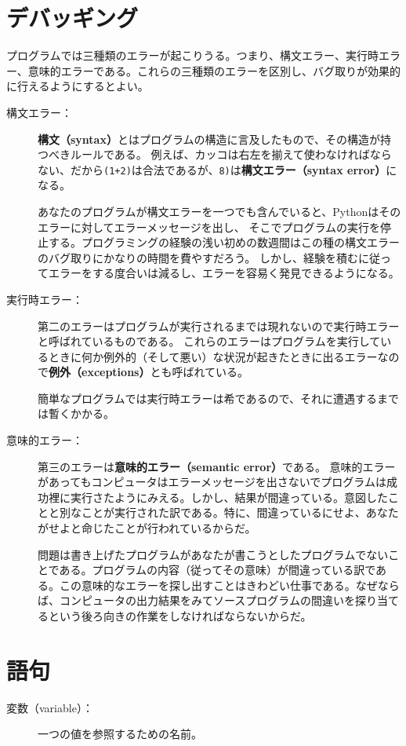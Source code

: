 \documentclass[a4j,12pt,makeidx]{jbook}
\begin{document}
{\section{デバッギング}
プログラムでは三種類のエラーが起こりうる。つまり、構文エラー、実行時エラー、意味的エラーである。これらの三種類のエラーを区別し、バグ取りが効果的に行えるようにするとよい。
\begin{description}
\item[構文エラー：] {\bf 構文（syntax）}とはプログラムの構造に言及したもので、その構造が持つべきルールである。
例えば、カッコは右左を揃えて使わなければならない、だから{\tt (1+2)}は合法であるが、{\tt 8)}は{\bf 構文エラー（syntax error）}になる。　\par
あなたのプログラムが構文エラーを一つでも含んでいると、Pythonはそのエラーに対してエラーメッセージを出し、
そこでプログラムの実行を停止する。プログラミングの経験の浅い初めの数週間はこの種の構文エラーのバグ取りにかなりの時間を費やすだろう。
しかし、経験を積むに従ってエラーをする度合いは減るし、エラーを容易く発見できるようになる。
\item[実行時エラー：] 第二のエラーはプログラムが実行されるまでは現れないので実行時エラーと呼ばれているものである。
これらのエラーはプログラムを実行しているときに何か例外的（そして悪い）な状況が起きたときに出るエラーなので{\bf 例外（exceptions）}とも呼ばれている。\par
簡単なプログラムでは実行時エラーは希であるので、それに遭遇するまでは暫くかかる。
\item [意味的エラー：] 第三のエラーは{\bf 意味的エラー（semantic error）}である。
意味的エラーがあってもコンピュータはエラーメッセージを出さないでプログラムは成功裡に実行さたようにみえる。しかし、結果が間違っている。意図したことと別なことが実行された訳である。特に、間違っているにせよ、あなたがせよと命じたことが行われているからだ。\par
問題は書き上げたプログラムがあなたが書こうとしたプログラムでないことである。プログラムの内容（従ってその意味）が間違っている訳である。この意味的なエラーを探し出すことはきわどい仕事である。なぜならば、コンピュータの出力結果をみてソースプログラムの間違いを探り当てるという後ろ向きの作業をしなければならないからだ。　
\end{description}
%
\section{語句}
\begin{description}
\item[変数（variable）：]一つの値を参照するための名前。


\end{description}}
\end{document}

